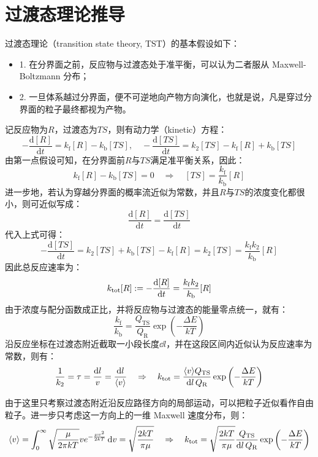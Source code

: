 \section{过渡态理论推导}\label{sec:tst}
过渡态理论（transition state theory, TST）的基本假设如下：
\begin{itemize}
    \item 1. 在分界面之前，反应物与过渡态处于准平衡，可以认为二者服从 Maxwell-Boltzmann 分布；
    \item 2. 一旦体系越过分界面，便不可逆地向产物方向演化，也就是说，凡是穿过分界面的粒子最终都视为产物。
\end{itemize}
记反应物为$R$，过渡态为$TS$，则有动力学（kinetic）方程：
\[-\frac{\mathrm{d} {[R]}}{\mathrm{d} t} = k_{\mathrm{f}}[R]-k_{\mathrm{b}}[TS], \quad -\frac{\mathrm{d} {[TS]}}{\mathrm{d} t} = k_2[TS]-k_{\mathrm{f}}[R]+k_{\mathrm{b}}[TS]\]
由第一点假设可知，在分界面前$R$与$TS$满足准平衡关系，因此：
\[k_{\mathrm{f}}[R]-k_{\mathrm{b}}[TS]=0 \quad \Rightarrow \quad [TS]=\frac{k_{\mathrm{f}}}{k_{\mathrm{b}}}[R]\]
进一步地，若认为穿越分界面的概率流近似为常数，并且$R$与$TS$的浓度变化都很小，则可近似写成：
\[\frac{\mathrm{d} {[R]}}{\mathrm{d} t} = \frac{\mathrm{d} {[TS]}}{\mathrm{d} t}\]
代入上式可得：
\[-\frac{\mathrm{d} {[TS]}}{\mathrm{d} t} = k_2[TS]+k_{\mathrm{b}}[TS]-k_{\mathrm{f}}[R]=k_2[TS]=\frac{k_{\mathrm{f}}k_2}{k_{\mathrm{b}}}[R]\]
因此总反应速率为：
\[k_{\rm tot}[R]:=-\frac{\mathrm{d} {[R]}}{\mathrm{d} t} = \frac{k_{\mathrm{f}}k_2}{k_{\mathrm{b}}}[R]\]
由于浓度与配分函数成正比，并将反应物与过渡态的能量零点统一，就有：
\[\frac{k_{\mathrm{f}}}{k_{\mathrm{b}}}= \frac{Q_{\mathrm{TS}}}{Q_{\mathrm{R}}} \exp\left(-\frac{\Delta E}{kT}\right)\]
沿反应坐标在过渡态附近截取一小段长度$\dd{l}$，并在这段区间内近似认为反应速率为常数，则有：
\[\frac{1}{k_2}= \tau = \frac{\dd{l}}{v} = \frac{\dd{l}}{\langle v \rangle} \quad \Rightarrow \quad k_{\rm tot}= \frac{\langle v \rangle Q_{\mathrm{TS}}}{\dd{l}Q_{\mathrm{R}}}\exp\left(-\frac{\Delta E}{kT}\right)\]

由于这里只考察过渡态附近沿反应路径方向的局部运动，可以把粒子近似看作自由粒子。进一步只考虑这一方向上的一维 Maxwell 速度分布，则：
\[\langle v \rangle = \int_{0}^{\infty}\sqrt{\frac{\mu}{2 \pi kT}}ve^{ - \frac{\mu v^2}{2kT}}\dd{v}=\sqrt{\frac{2kT}{\pi \mu}} \quad \Rightarrow \quad k_{\rm tot}=\sqrt{\frac{2kT}{\pi \mu}}\frac{Q_{\mathrm{TS}}}{\dd{l}Q_{\mathrm{R}}}\exp\left(-\frac{\Delta E}{kT}\right)\]


